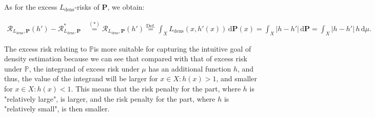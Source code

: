 \documentclass{article}
\begin{document}
$\quad$ \vspace*{-3em}\\
As for the excess $L_{\text{dens}}$-risks of $\mathbf{P}$, we obtain:
\begin{spacing}{1.8} \vspace*{-1.3cm}
\begin{align*}
\mathcal{R}_{L_{\text{dens}},\mathbf{P}}(h')-\mathcal{R}_{L_{\text{dens}},\mathbf{P}}^* & \overset{(*)}{=} \mathcal{R}_{L_{\text{dens}},\mathbf{P}}(h') \overset{\text{Def.}}{=}  \displaystyle{ \int_X L_{\text{dens}}(x,h'(x)) \,  \text{d}\mathbf{P}(x) }  =  \displaystyle{ \int_X |h-h'| \,  \text{d}\mathbf{P} } =  \displaystyle{ \int_X |h-h'| \, h \,  \text{d}\mu }.
\end{align*}
\end{spacing}
$\quad$\vspace*{-0.7cm}\\
The excess risk relating to $\mathbb{P} $is more suitable for capturing the intuitive goal of density estimation because we can see that compared with that of excess risk under $\mathbb{P}$, the integrand of excess risk under $\mu$ has an additional function $h$, and thus, the value of the integrand will be larger for $x\in X: h(x)>1$, and smaller for $x\in X: h(x)<1$. This means that the risk penalty for the part, where $h$ is "relatively large", is larger, and the risk penalty for the part, where $h$ is "relatively small", is then smaller.  \\


\newpage
\end{document}
